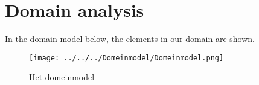 \section{Domain analysis}
In the domain model below, the elements in our domain are shown.
\begin{figure}[H]
	\centering
	\texttt{[image: ../../../Domeinmodel/Domeinmodel.png]}
	\caption{Het domeinmodel}
	\label{cd:domeinmodel}
\end{figure}